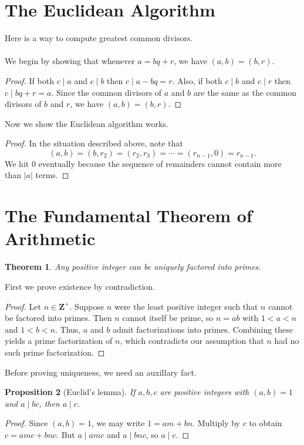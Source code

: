 \documentclass{amsbook}
\numberwithin{section}{chapter}
\theoremstyle{plain}
\newtheorem{thm}{Theorem}[section]
\newtheorem{prop}[thm]{Proposition}
\theoremstyle{definition}
\def\br{~\\[1em]}
\def\ZZ{\mathbf Z}
\begin{document}
\section{The Euclidean Algorithm}
Here is a way to compute greatest common divisors.
\br
\hspace*{2em}
\br
We begin by showing that whenever
$a = bq + r$, we have $(a, b) = (b, r)$.
\begin{proof}
If both $c\mid a$ and $c\mid b$ then $c\mid a - bq = r$.
Also, if both $c\mid b$ and $c\mid r$ then $c\mid bq + r = a$.
Since the common divisors of $a$ and $b$ are the same as the
common divisors of $b$ and $r$, we have $(a, b) = (b, r)$.
\end{proof}
Now we show the Euclidean algorithm works.
\begin{proof}
In the situation described above, note that
\[(a, b) = (b, r_2) = (r_2, r_3) = \cdots = (r_{n-1}, 0) = r_{n-1}.\]
We hit 0 eventually because the sequence of remainders cannot contain
more than $|a|$ terms.
\end{proof}
\section{The Fundamental Theorem of Arithmetic}
\begin{thm}
Any positive integer can be uniquely factored into primes.
\end{thm}
First we prove existence by contradiction.
\begin{proof}
Let $n\in\ZZ^+$. Suppose $n$ were the least
positive integer such that $n$ cannot be factored into primes. Then
$n$ cannot itself be prime, so $n = ab$ with
$1 < a < n$ and $1 < b < n$. Thus, $a$ and $b$ admit
factorizations into primes. Combining these yields
a prime factorization of $n$, which contradicts our assumption that
$n$ had no such prime factorization.
\end{proof}
Before proving uniqueness, we need an auxillary fact.
\begin{prop}[Euclid's lemma]
If $a, b, c$ are
positive integers with $(a, b) = 1$ and $a\mid bc$, then $a\mid c$.
\end{prop}
\begin{proof}
Since $(a, b) = 1$, we may write $1 = am + bn$. Multiply by $c$
to obtain $c = amc + bnc$. But $a\mid amc$ and $a\mid bnc$,
so $a\mid c$.
\end{proof}
\end{document}
